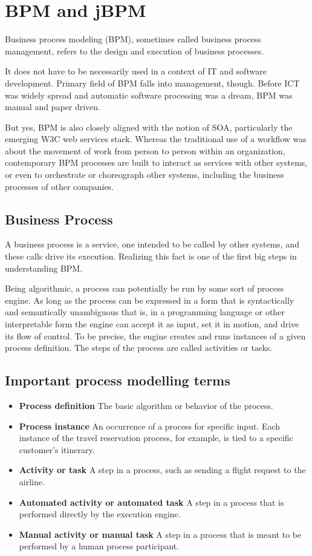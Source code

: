 \chapter{BPM and jBPM}\label{bpm}

	\cite{bpm}
	Business process modeling (BPM), sometimes called business process management, refers to the design and execution of
	business processes.
	
	It does not have to be necessarily used in a context of \gls{IT} and software development. Primary field of BPM falls
	into management, though. Before \gls{ICT} was widely spread and automatic software processing was a dream, BPM was
	manual and paper driven.

	But yes, BPM is also closely aligned with the notion of \gls{SOA}, particularly the emerging W3C web services
	stack. Whereas the traditional use of a workflow was about the movement of work from person to person within an
	organization, contemporary BPM processes are built to interact as services with other systems, or even to orchestrate
	or choreograph other systems, including the business processes of other companies.

	\section{Business Process}

	A business process is a service, one intended to be called by other systems, and these calls drive its execution.
	Realizing this fact is one of the first big steps in understanding BPM.
	
	Being algorithmic, a process can potentially be run by some sort of process engine. As long as the process can be
	expressed in a form that is syntactically and semantically unambiguous that is, in a programming language or other
	interpretable form the engine can accept it as input, set it in motion, and drive its flow of control. To be precise,
	the engine creates and runs instances of a given process definition. The steps of the process are called activities or
	tasks.
	
	\section{Important process modelling terms}
	\begin{itemize}
		\item \textbf{Process definition}
		The basic algorithm or behavior of the process.
		\item \textbf{Process instance}
		An occurrence of a process for specific input. Each instance of the travel reservation process, for example, is tied
		to a specific customer's itinerary.
		\item \textbf{Activity or task}
		A step in a process, such as sending a flight request to the airline.
		\item \textbf{Automated activity or automated task}
		A step in a process that is performed directly by the execution engine.
		\item \textbf{Manual activity or manual task}
		A step in a process that is meant to be performed by a human process participant. 
	\end{itemize}
	
